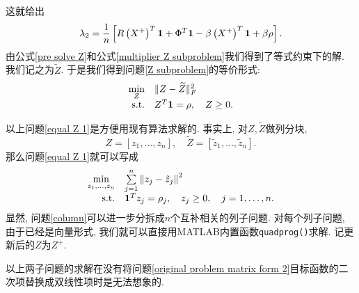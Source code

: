 这就给出
\begin{equation}
	\lambda_2=\frac{1}{n}\left[R\left(X^+\right)^T\mathbf{1}+\Phi^T\mathbf{1}-\beta\left(X^+\right)^T\mathbf{1}+\beta\rho\right].
	\label{multiplier Z subproblem}
\end{equation}
由公式\eqref{pre solve Z}和公式\eqref{multiplier Z subproblem}我们得到了等式约束下的解. 我们记之为$\widetilde Z$. 于是我们得到问题\eqref{Z subproblem}的等价形式:
\begin{equation}
	\begin{array}{rl}
		\min\limits_Z & \Vert Z-\widetilde Z\Vert_F^2\\
		\mathrm{s.t.} & Z^T\mathbf{1}=\rho,\quad Z\ge0.
	\end{array}
	\label{equal Z 1}
\end{equation}
\par 以上问题\eqref{equal Z 1}是方便用现有算法求解的. 事实上, 对$Z,\widetilde Z$做列分块, 
$$Z=[z_1,\ldots,z_n],\quad\widetilde Z=[\tilde z_1,\ldots,\tilde z_n].$$
那么问题\eqref{equal Z 1}就可以写成
\begin{equation}
	\begin{array}{rl}
	\min\limits_{z_1,\ldots,z_n} & \sum\limits_{j=1}^n\left\Vert z_j-\tilde z_j\right\Vert^2\\
	\mathrm{s.t.} & \mathbf{1}^Tz_j=\rho_j,\quad z_j\ge0,\quad j=1,\ldots,n.
	\end{array}
	\label{column}
\end{equation}
显然, 问题\eqref{column}可以进一步分拆成$n$个互补相关的列子问题. 对每个列子问题, 由于已经是向量形式, 我们就可以直接用MATLAB内置函数\texttt{quadprog()}求解. 记更新后的$Z$为$Z^+$.

\begin{rem}
	以上两子问题的求解在没有将问题\eqref{original problem matrix form 2}目标函数的二次项替换成双线性项时是无法想象的.
\end{rem}

